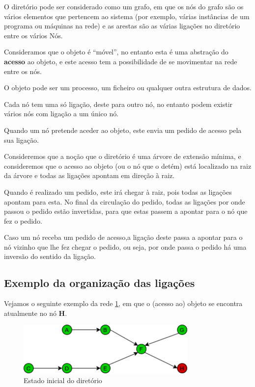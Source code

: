 O diretório pode ser considerado como um grafo, em que os nós do grafo são os vários elementos que pertencem ao sistema (por exemplo, várias instâncias de um programa ou máquinas na rede) e as arestas são as várias ligações no diretório entre os vários Nós.


Consideramos que o objeto é ``móvel'', no entanto esta é uma abstração do \textbf{acesso} ao objeto, e este acesso tem a possibilidade de se movimentar na rede entre os nós.

O objeto pode ser um processo, um ficheiro ou qualquer outra estrutura de dados.

Cada nó tem uma só ligação, deste para outro nó, no entanto podem existir vários nós com ligação a um único nó.

Quando um nó pretende aceder ao objeto, este envia um pedido de acesso pela sua ligação. 



Consideremos que a noção que o diretório é uma árvore de extensão mínima, e consideremos que o acesso ao objeto (ou o nó que o detém) está localizado na raiz da árvore e todas as ligações apontam em direção à raiz.

Quando é realizado um pedido, este irá chegar à raiz, pois todas as ligações apontam para esta. No final da circulação do pedido, todas as ligações por onde passou o pedido estão invertidas, para que estas passem a apontar para o nó que fez o pedido.

Caso um nó receba um pedido de acesso,a ligação deste passa a apontar para o nó vizinho que lhe fez chegar o pedido, ou seja, por onde passa o pedido há uma inversão do sentido da ligação.



\subsection*{Exemplo da organização das ligações}

Vejamos o seguinte exemplo da rede \ref{motivacao:img:estado_inicial}, em que o (acesso ao) objeto se encontra atualmente no nó \textbf{H}.


\begin{figure}[!htb]
\centering
\includegraphics[width=250pt]{um_pedido_1.png}
\caption{Estado inicial do diretório}
\label{motivacao:img:estado_inicial}
\end{figure}

